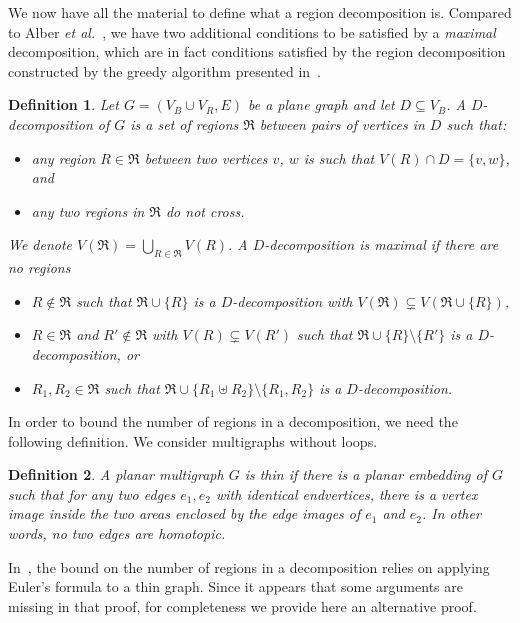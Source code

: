\documentclass[a4paper,11pt]{article}
\newtheorem{defi} {Definition}
\begin{document}
We now have all the material to define what a region decomposition is. Compared to Alber \emph{et al.}~\cite[Definition 3]{AFN04}, we have two additional conditions to be satisfied by a \emph{maximal} decomposition, which are in fact conditions satisfied by the region decomposition constructed by the greedy algorithm presented in~\cite{AFN04}.

\begin{defi}\label{def:regionDec} Let $G = (V_B \cup V_R,E) $ be a plane graph and let $D \subseteq V_B$.
A \emph{$D$-decomposition} of $G$ is a set of regions $\Re$ between pairs of vertices in $D$ such that:
\begin{itemize}\itemsep0em
  \item any region $R \in \Re$ between two vertices $v$, $w$ is such that $V(R)\cap D =\{v,w\}$, and
  \item any two regions in $\Re$ do not cross.
\end{itemize}

We denote $V(\Re) = \bigcup _{R\in\Re} V(R)$. A $D$-decomposition is \emph{maximal} if there are no regions
\begin{itemize}
\item $R \notin \Re$ such that $\Re \cup \{R\}$ is a $D$-decomposition with $V(\Re) \subsetneq V(\Re \cup \{R\})$,
\item $R \in \Re$  and $R' \notin \Re$ with $V(R) \subsetneq V(R')$ such that $\Re \cup \{R\} \setminus \{R'\}$ is a $D$-decomposition, or
\item  $R_1,R_2 \in \Re$ such that $\Re \cup \{R_1 \uplus R_2\} \setminus \{R_1,R_2\}$ is a $D$-decomposition.
\end{itemize}

\end{defi}



In order to bound the number of regions in a decomposition, we need the following definition. We consider multigraphs without loops.

\begin{defi}\label{def:thin}
A planar multigraph $G$ is \emph{thin} if there is a planar embedding of $G$ such that for any two edges $e_1,e_2$ with identical endvertices,
there is a vertex image inside the two areas enclosed by the edge images of $e_1$ and $e_2$. In other words, no two edges are homotopic.
\end{defi}

In~\cite[Lemma 5]{AFN04}, the bound on the number of regions in a decomposition relies on applying Euler's formula to a thin graph. Since it appears that some arguments are missing in that proof, for completeness we provide here an alternative proof.
\end{document}
